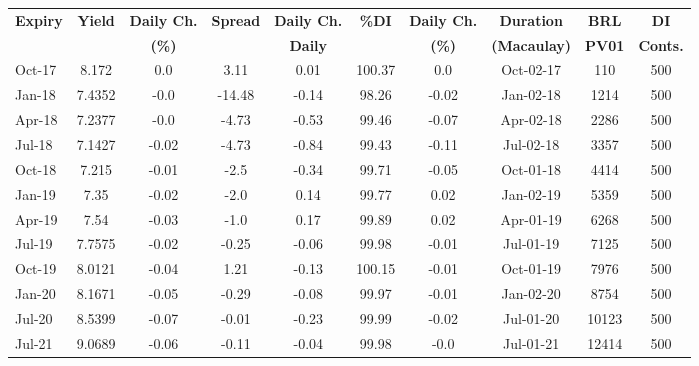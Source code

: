 \documentclass[article,crop=false]{standalone}%
\begin{document}
%
\normalsize%
\setlength{\tabcolsep}{0.15cm}%
\begin{tabular}[h]{l|c c|c c|c c|c c c}%
\hline%
\rowcolor{white}%
\textbf{Expiry}&\textbf{Yield}&\textbf{Daily Ch.}&\textbf{Spread}&\textbf{Daily Ch.}&\textbf{\%DI}&\textbf{Daily Ch.}&\textbf{Duration}&\textbf{BRL}&\textbf{DI}\\%
\rowcolor{white}%
\textbf{}&\textbf{}&\textbf{(\%)}&\textbf{}&\textbf{Daily}&\textbf{}&\textbf{(\%)}&\textbf{(Macaulay)}&\textbf{PV01}&\textbf{Conts.}\\%
\hline%
\rowcolor{lightgray}%
Oct{-}17&8.172&0.0&3.11&0.01&100.37&0.0&Oct{-}02{-}17&110&500\\%
\rowcolor{white}%
Jan{-}18&7.4352&{-}0.0&{-}14.48&{-}0.14&98.26&{-}0.02&Jan{-}02{-}18&1214&500\\%
\rowcolor{lightgray}%
Apr{-}18&7.2377&{-}0.0&{-}4.73&{-}0.53&99.46&{-}0.07&Apr{-}02{-}18&2286&500\\%
\rowcolor{white}%
Jul{-}18&7.1427&{-}0.02&{-}4.73&{-}0.84&99.43&{-}0.11&Jul{-}02{-}18&3357&500\\%
\rowcolor{lightgray}%
Oct{-}18&7.215&{-}0.01&{-}2.5&{-}0.34&99.71&{-}0.05&Oct{-}01{-}18&4414&500\\%
\rowcolor{white}%
Jan{-}19&7.35&{-}0.02&{-}2.0&0.14&99.77&0.02&Jan{-}02{-}19&5359&500\\%
\rowcolor{lightgray}%
Apr{-}19&7.54&{-}0.03&{-}1.0&0.17&99.89&0.02&Apr{-}01{-}19&6268&500\\%
\rowcolor{white}%
Jul{-}19&7.7575&{-}0.02&{-}0.25&{-}0.06&99.98&{-}0.01&Jul{-}01{-}19&7125&500\\%
\rowcolor{lightgray}%
Oct{-}19&8.0121&{-}0.04&1.21&{-}0.13&100.15&{-}0.01&Oct{-}01{-}19&7976&500\\%
\rowcolor{white}%
Jan{-}20&8.1671&{-}0.05&{-}0.29&{-}0.08&99.97&{-}0.01&Jan{-}02{-}20&8754&500\\%
\rowcolor{lightgray}%
Jul{-}20&8.5399&{-}0.07&{-}0.01&{-}0.23&99.99&{-}0.02&Jul{-}01{-}20&10123&500\\%
\rowcolor{white}%
Jul{-}21&9.0689&{-}0.06&{-}0.11&{-}0.04&99.98&{-}0.0&Jul{-}01{-}21&12414&500\\%
\hline%
\end{tabular}%
\end{document}
